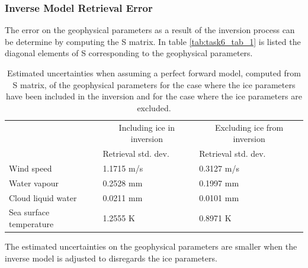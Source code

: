 \documentclass[11pt, a4paper]{article}
\begin{document}
\subsubsection{Inverse Model Retrieval Error}
The error on the geophysical parameters as a result of the inversion process can be determine by computing the S matrix. In table \ref{tab:task6_tab_1} is listed the diagonal elements of S corresponding to the geophysical parameters.
\newline 

\begin{table}[h!]
	\centering
	\begin{tabular}{@{}p{4.0cm}p{3.3cm}p{3.3cm}@{}}
		\tabularnewline
		& \multicolumn{1}{c}{Including ice in inversion} & \multicolumn{1}{c}{Excluding ice from inversion}
		\tabularnewline
		\cmidrule(r{1em}){2-2} \cmidrule(l{1em}){3-3}
		& Retrieval std. dev. & Retrieval std. dev.
		\tabularnewline
		\midrule
		Wind speed	& 1.1715 m/s	& 0.3127 m/s		\\
		Water vapour		& 0.2528 mm	& 0.1997 mm		\\
		Cloud liquid water		& 0.0211 mm	& 0.0101 mm	 \\
		Sea surface temperature	& 1.2555 K	& 0.8971 K 	\\
		\midrule
	\end{tabular}
	\caption{Estimated uncertainties when assuming a perfect forward model, computed from S matrix, of the geophysical parameters for the case where the ice parameters have been included in the inversion and for the case where the ice parameters are excluded.}
	\label{tab:task6_tab_2}
\end{table}

The estimated uncertainties on the geophysical parameters are smaller when the inverse model is adjusted to disregards the ice parameters.
\end{document}
